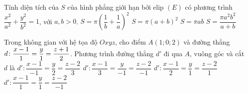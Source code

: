 	\begin{ex}%
		Tính diện tích của $S$ của hình phẳng giới hạn bởi elip $(E)$ có phương trình $\dfrac{x^2}{a^2}+\dfrac{y^2}{b^2}=1$, với $a,b>0$.
		\choice
		{$S=\pi {\left(\dfrac{1}{b}+\dfrac{1}{a}\right)}^2$}
		{$S=\pi {(a+b)}^2$}
		{\True $S=\pi ab$}
		{$S=\dfrac{\pi a^2b^2}{a+b}$}
	\end{ex}
	
	\begin{ex}%
		Trong không gian với hệ tọa độ $Oxyz$, cho điểm $A(1;0;2)$ và đường thẳng $\break d\colon \dfrac{x-1}{1}=\dfrac{y}{1}=\dfrac{z+1}{2}$. Phương trình đường thẳng $d'$ đi qua $A$, vuông góc và cắt $d$ là
		\choice
		{$d'\colon \dfrac{x-1}{-1}=\dfrac{y}{2}=\dfrac{z-2}{3}$}
		{$d'\colon\dfrac{x-1}{3}=\dfrac{y}{-1}=\dfrac{z-2}{-1}$}
		{$d'\colon\dfrac{x-1}{2}=\dfrac{y}{1}=\dfrac{z-2}{1}$}
		{\True $d'\colon\dfrac{x-1}{1}=\dfrac{y}{1}=\dfrac{z-2}{-1}$}
	\end{ex}
	
